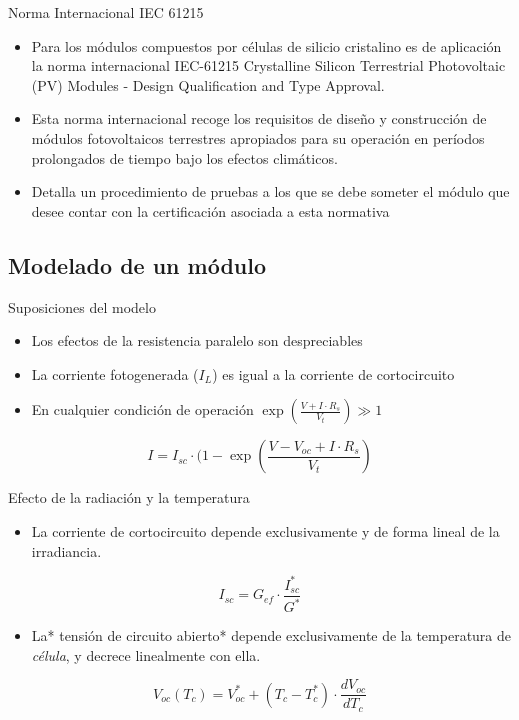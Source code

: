 \documentclass[xcolor={usenames,svgnames,dvipsnames}]{beamer}
\begin{document}
\begin{frame}[label=sec-1-1-6]{Norma Internacional IEC 61215}
\begin{itemize}
\item Para los módulos compuestos por \alert{células de silicio cristalino} es de aplicación la \alert{norma internacional IEC-61215} \guillemotleft{}Crystalline Silicon
Terrestrial Photovoltaic (PV) Modules - Design Qualification and Type Approval\guillemotright{}.

\item Esta norma internacional recoge los \alert{requisitos de diseño y construcción} de módulos fotovoltaicos terrestres apropiados para su operación en períodos prolongados de tiempo bajo los efectos climáticos.

\item Detalla un \alert{procedimiento de pruebas} a los que se debe someter el módulo que desee contar con la certificación asociada a esta normativa
\end{itemize}
\end{frame}

\subsection{Modelado de un módulo}
\label{sec-1-2}

\begin{frame}[label=sec-1-2-1]{Suposiciones del modelo}
\begin{itemize}
\item Los efectos de la resistencia paralelo son despreciables

\item La corriente fotogenerada ($I_{L}$) es igual a la corriente de cortocircuito

\item En cualquier condición de operación $\exp(\frac{V+I\cdot R_{s}}{V_{t}})\gg1$
\end{itemize}

$$I=I_{sc}\cdot(1-\exp(\frac{V-V_{oc}+I\cdot R_{s}}{V_{t}})$$
\end{frame}

\begin{frame}[label=sec-1-2-2]{Efecto de la radiación y la temperatura}
\begin{itemize}
\item La \alert{corriente de cortocircuito} depende exclusivamente y de forma lineal de la \alert{irradiancia}.
\end{itemize}
$$I_{sc}=G_{ef}\cdot\frac{I_{sc}^{*}}{G^{*}}$$

\begin{itemize}
\item La* tensión de circuito abierto* depende exclusivamente de la \alert{temperatura de \emph{célula}}, y decrece linealmente con ella.
\end{itemize}
$$V_{oc}(T_{c})=V_{oc}^{*}+(T_{c}-T_{c}^{*})\cdot\frac{dV_{oc}}{dT_{c}}$$
\end{frame}
\end{document}
